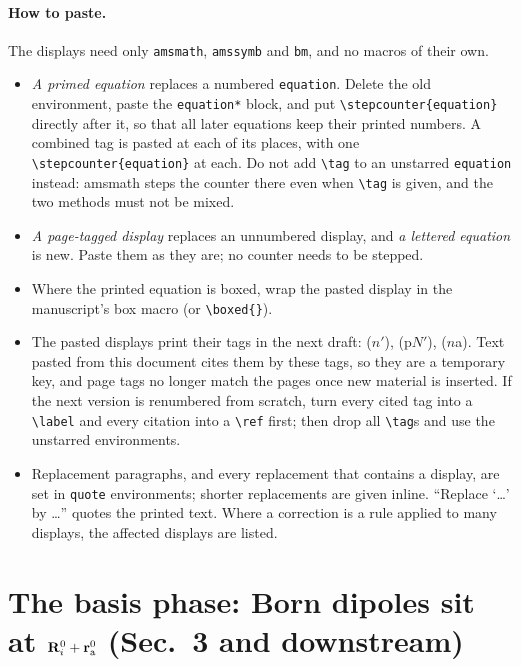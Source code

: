 \documentclass[11pt]{article}
\begin{document}
\paragraph{How to paste.}
The displays need only \texttt{amsmath}, \texttt{amssymb} and \texttt{bm}, and no macros of their own.
\begin{itemize}
\item \emph{A primed equation} replaces a numbered \verb|equation|. Delete the old environment, paste
the \verb|equation*| block, and put \verb|\stepcounter{equation}| directly after it, so that all later
equations keep their printed numbers. A combined tag is pasted at each of its places, with one
\verb|\stepcounter{equation}| at each. Do not add \verb|\tag| to an unstarred \verb|equation| instead:
amsmath steps the counter there even when \verb|\tag| is given, and the two methods must not be mixed.
\item \emph{A page-tagged display} replaces an unnumbered display, and \emph{a lettered equation} is new.
Paste them as they are; no counter needs to be stepped.
\item Where the printed equation is boxed, wrap the pasted display in the manuscript's box macro (or
\verb|\boxed{}|).
\item The pasted displays print their tags in the next draft: ($n'$), (p$N'$), ($n$a). Text pasted from
this document cites them by these tags, so they are a temporary key, and page tags no longer match
the pages once new material is inserted. If the next version is renumbered from scratch, turn every
cited tag into a \verb|\label| and every citation into a \verb|\ref| first; then drop all \verb|\tag|s
and use the unstarred environments.
\item Replacement paragraphs, and every replacement that contains a display, are set in \texttt{quote}
environments; shorter replacements are given inline. ``Replace `\ldots' by \ldots'' quotes the printed
text. Where a correction is a rule applied to many displays, the affected displays are listed.
\end{itemize}

\section{The basis phase: Born dipoles sit at $\mathbf R^0_i+\mathbf r^0_{\rm a}$ (Sec.~3 and downstream)}\label{sec:phase}
\end{document}
